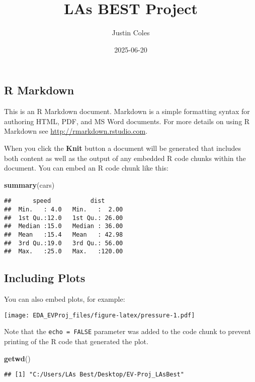 \documentclass[
]{article}
\title{LAs BEST Project}
\author{Justin Coles}
\date{2025-06-20}
\newenvironment{Shaded}{\begin{snugshade}}{\end{snugshade}}
\newcommand{\FunctionTok}[1]{\textcolor[rgb]{0.13,0.29,0.53}{\textbf{#1}}}
\newcommand{\NormalTok}[1]{#1}
\begin{document}
\maketitle

\subsection{R Markdown}\label{r-markdown}

This is an R Markdown document. Markdown is a simple formatting syntax
for authoring HTML, PDF, and MS Word documents. For more details on
using R Markdown see \url{http://rmarkdown.rstudio.com}.

When you click the \textbf{Knit} button a document will be generated
that includes both content as well as the output of any embedded R code
chunks within the document. You can embed an R code chunk like this:

\begin{Shaded}
\begin{Highlighting}[]
\FunctionTok{summary}\NormalTok{(cars)}
\end{Highlighting}
\end{Shaded}

\begin{verbatim}
##      speed           dist       
##  Min.   : 4.0   Min.   :  2.00  
##  1st Qu.:12.0   1st Qu.: 26.00  
##  Median :15.0   Median : 36.00  
##  Mean   :15.4   Mean   : 42.98  
##  3rd Qu.:19.0   3rd Qu.: 56.00  
##  Max.   :25.0   Max.   :120.00
\end{verbatim}

\subsection{Including Plots}\label{including-plots}

You can also embed plots, for example:

\texttt{[image: EDA\_EVProj\_files/figure-latex/pressure-1.pdf]}

Note that the \texttt{echo\ =\ FALSE} parameter was added to the code
chunk to prevent printing of the R code that generated the plot.

\begin{Shaded}
\begin{Highlighting}[]
\FunctionTok{getwd}\NormalTok{()}
\end{Highlighting}
\end{Shaded}

\begin{verbatim}
## [1] "C:/Users/LAs Best/Desktop/EV-Proj_LAsBest"
\end{verbatim}
\end{document}
